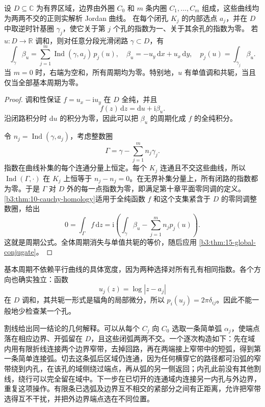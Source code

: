\begin{lemma}[有限连通域的基本周期]\label{b3:lem:17-period-basis}
设 \(D\subseteq\mathbb C\) 为有界区域，边界由外圈 \(C_0\) 和 \(m\) 条内圈
\(C_1,\ldots,C_m\) 组成，这些曲线均为两两不交的正则实解析 Jordan 曲线。
在每个闭孔 \(K_j\) 的内部选点 \(a_j\)，并在 \(D\) 中取逆时针基圈
\(\gamma_j\)，使它关于第 \(j\) 个孔的指数为一、关于其余孔的指数为零。
若 \(u:D\to\mathbb R\) 调和，则对任意分段光滑闭路 \(\gamma\subset D\)，有
\[
 \int_\gamma\beta_u
 =\sum_{j=1}^m\operatorname{Ind}(\gamma,a_j)\,p_j(u),
 \quad
 \beta_u=-u_y\,\mathrm dx+u_x\,\mathrm dy,\quad
 p_j(u)=\int_{\gamma_j}\beta_u.
\]
当 \(m=0\) 时，右端为空和，所有周期均为零。特别地，\(u\) 有单值调和共轭，当且仅当全部基本周期为零。
\end{lemma}
\begin{proof}
调和性保证 \(f=u_x-\mathrm i u_y\) 在 \(D\) 全纯，并且
\[
 f(z)\,\mathrm dz=\mathrm du+\mathrm i\beta_u.
\]
沿闭路积分时 \(\mathrm du\) 的积分为零，因此可以把 \(\beta_u\) 的周期化成
\(f\) 的全纯积分。

令 \(n_j=\operatorname{Ind}(\gamma,a_j)\)，考虑整数圈
\[
 \Gamma=\gamma-\sum_{j=1}^m n_j\gamma_j.
\]
指数在曲线补集的每个连通分量上恒定。每个 \(K_j\) 连通且不交这些曲线，所以
\(\operatorname{Ind}(\Gamma,\cdot)\) 在 \(K_j\) 上恒等于
\(n_j-n_j=0\)。在无界补集分量上，所有闭路的指数都为零。于是
\(\Gamma\) 对 \(D\) 外的每一点指数为零，即满足第十章平面零同调的定义。
\cref{b3:thm:10-cauchy-homology}适用于全纯函数 \(f\) 和这个支集紧含于
\(D\) 的零同调整数圈，给出
\[
 0=\int_\Gamma f\,\mathrm dz
 =\mathrm i\left(\int_\gamma\beta_u
       -\sum_{j=1}^m n_jp_j(u)\right).
\]
这就是周期公式。全体周期消失与单值共轭的等价，随后应用
\cref{b3:thm:15-global-conjugate}。
\end{proof}

基本周期不依赖平行曲线的具体宽度，因为两种选择对所有孔有相同指数。各个方向也确实独立：函数
\[
 u_j(z)=\log|z-a_j|
\]
在 \(D\) 调和，其共轭一形式是辐角的局部微分，所以
\(p_i(u_j)=2\pi\delta_{ij}\)。因此不能一般地少检查某一个孔。

\ProseParagraphBreak
割线给出同一结论的几何解释。可以从每个 \(C_j\) 向 \(C_0\) 选取一条简单弧
\(\alpha_j\)，使端点落在相应边界、开弧留在 \(D\)，且这些闭弧两两不交。一个逐次构造如下：先在域内用有限折线连接两个边界窄带，去掉回路，再在两端接上窄带中的短弧，得到第一条简单连接弧。切去这条弧后区域仍连通，因为任何横穿它的路径都可沿弧的窄带绕到内孔，在该孔的域侧绕过端点，再从弧的另一侧返回；内孔此前没有其他割线，绕行可以完全留在域中。下一步在已切开的连通域内连接另一内孔与外边界，重复这项操作。有限条已选弧及边界互不相交的紧部分之间有正距离，允许把窄带选得互不干扰，并把外边界端点选在不同位置。

